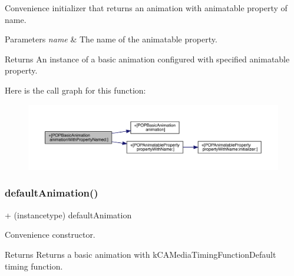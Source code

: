 Convenience initializer that returns an animation with animatable property of name. 
\begin{DoxyParams}{Parameters}
{\em name} & The name of the animatable property. \\
\hline
\end{DoxyParams}
\begin{DoxyReturn}{Returns}
An instance of a basic animation configured with specified animatable property. 
\end{DoxyReturn}
Here is the call graph for this function\+:\nopagebreak
\begin{figure}[H]
\begin{center}
\leavevmode
\includegraphics[width=350pt]{interface_p_o_p_basic_animation_aa6332608f15c63f9ca6837fd595a2032_cgraph}
\end{center}
\end{figure}
\mbox{\label{interface_p_o_p_basic_animation_a93bf55b391828d3e76031be39bcdbd1f}} 
\subsubsection{\texorpdfstring{default\+Animation()}{defaultAnimation()}\hspace{0.1cm}{\footnotesize\ttfamily [1/3]}}
{\footnotesize\ttfamily + (instancetype) default\+Animation \begin{DoxyParamCaption}{ }\end{DoxyParamCaption}}

Convenience constructor. \begin{DoxyReturn}{Returns}
Returns a basic animation with k\+C\+A\+Media\+Timing\+Function\+Default timing function. 
\end{DoxyReturn}
\mbox{\label{interface_p_o_p_basic_animation_a93bf55b391828d3e76031be39bcdbd1f}} 
